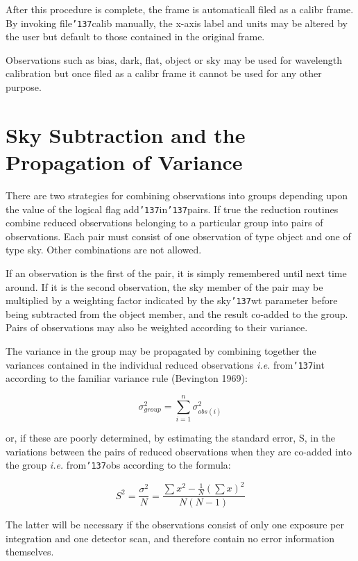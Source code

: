 \documentclass[a4paper]{book}
\renewcommand{\_}{{\tt\char'137}}
\begin{document}
After this procedure is complete, the frame is automaticall filed as a {\sc
calibr} frame. By invoking file\_calib manually, the x-axis label and units may be
altered by the user but default to those contained in the original frame.

Observations such as {\sc bias}, {\sc dark}, {\sc flat}, {\sc object} or
{\sc sky} may be used for wavelength calibration but once filed as a
{\sc calibr} frame it cannot be used for any other purpose.

\section{Sky Subtraction and the Propagation of Variance}
There are two strategies for combining observations into groups depending
upon the value of the logical flag add\_in\_pairs. If {\sc true} the
reduction routines combine reduced observations belonging to a particular
group into pairs of observations. Each pair must consist of one
observation of type {\sc object} and one of type {\sc sky}. Other
combinations are not allowed.

If an observation is the first of the pair, it is simply remembered until
next time around. If it is the second observation, the {\sc sky} member of
the pair may be multiplied by a weighting factor indicated by the sky\_wt
parameter before being subtracted from the {\sc object} member, and the
result co-added to the group. Pairs of observations may also be weighted
according to their variance.

The variance in the group may be propagated by combining together the
variances contained in the individual reduced observations {\em i.e.}
{\sc from\_int} according to the familiar variance rule (Bevington 1969):

\begin{equation}
\sigma^{2}_{group} = \sum_{i=1}^{n} \sigma^{2}_{obs(i)} \label{equation_2}
\end{equation}

or, if these are poorly determined, by estimating the standard error, S,
in the variations between the pairs of reduced observations when they are
co-added into the group {\em i.e.} {\sc from\_obs} according to the
formula:

\begin{equation}
S^2 = \frac{\sigma^2}{N} = \frac{\sum x^{2} - \frac{1}{N}(\sum x )^{2}}{N(N-1)} \label{equation_3}
\end{equation}

The latter will be necessary if the observations consist of only one
exposure per integration and one detector scan, and therefore contain no
error information themselves.
\end{document}
